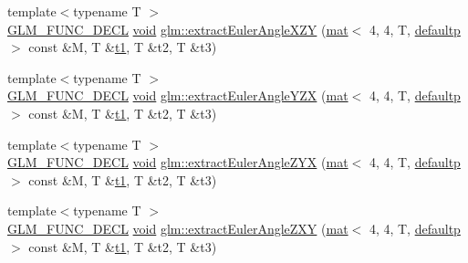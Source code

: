 \begin{DoxyCompactItemize}
\item 
{\footnotesize template$<$typename T $>$ }\\\hyperlink{setup_8hpp_ab2d052de21a70539923e9bcbf6e83a51}{G\+L\+M\+\_\+\+F\+U\+N\+C\+\_\+\+D\+E\+CL} \hyperlink{_s_d_l__opengles2__gl2ext_8h_ae5d8fa23ad07c48bb609509eae494c95}{void} \hyperlink{group__gtx__euler__angles_gabe5a65d8eb1cd873c8de121cce1a15ed}{glm\+::extract\+Euler\+Angle\+X\+ZY} (\hyperlink{structglm_1_1mat}{mat}$<$ 4, 4, T, \hyperlink{namespaceglm_a36ed105b07c7746804d7fdc7cc90ff25a9d21ccd8b5a009ec7eb7677befc3bf51}{defaultp} $>$ const \&M, T \&\hyperlink{_s_d_l__opengl__glext_8h_af48031a37b713afa3b0d0d7d29653d7c}{t1}, T \&t2, T \&t3)
\item 
{\footnotesize template$<$typename T $>$ }\\\hyperlink{setup_8hpp_ab2d052de21a70539923e9bcbf6e83a51}{G\+L\+M\+\_\+\+F\+U\+N\+C\+\_\+\+D\+E\+CL} \hyperlink{_s_d_l__opengles2__gl2ext_8h_ae5d8fa23ad07c48bb609509eae494c95}{void} \hyperlink{group__gtx__euler__angles_ga9049b78466796c0de2971756e25b93d3}{glm\+::extract\+Euler\+Angle\+Y\+ZX} (\hyperlink{structglm_1_1mat}{mat}$<$ 4, 4, T, \hyperlink{namespaceglm_a36ed105b07c7746804d7fdc7cc90ff25a9d21ccd8b5a009ec7eb7677befc3bf51}{defaultp} $>$ const \&M, T \&\hyperlink{_s_d_l__opengl__glext_8h_af48031a37b713afa3b0d0d7d29653d7c}{t1}, T \&t2, T \&t3)
\item 
{\footnotesize template$<$typename T $>$ }\\\hyperlink{setup_8hpp_ab2d052de21a70539923e9bcbf6e83a51}{G\+L\+M\+\_\+\+F\+U\+N\+C\+\_\+\+D\+E\+CL} \hyperlink{_s_d_l__opengles2__gl2ext_8h_ae5d8fa23ad07c48bb609509eae494c95}{void} \hyperlink{group__gtx__euler__angles_ga2d6c11a4abfa60c565483cee2d3f7665}{glm\+::extract\+Euler\+Angle\+Z\+YX} (\hyperlink{structglm_1_1mat}{mat}$<$ 4, 4, T, \hyperlink{namespaceglm_a36ed105b07c7746804d7fdc7cc90ff25a9d21ccd8b5a009ec7eb7677befc3bf51}{defaultp} $>$ const \&M, T \&\hyperlink{_s_d_l__opengl__glext_8h_af48031a37b713afa3b0d0d7d29653d7c}{t1}, T \&t2, T \&t3)
\item 
{\footnotesize template$<$typename T $>$ }\\\hyperlink{setup_8hpp_ab2d052de21a70539923e9bcbf6e83a51}{G\+L\+M\+\_\+\+F\+U\+N\+C\+\_\+\+D\+E\+CL} \hyperlink{_s_d_l__opengles2__gl2ext_8h_ae5d8fa23ad07c48bb609509eae494c95}{void} \hyperlink{group__gtx__euler__angles_ga81fbbca2ba0c778b9662d5355b4e2363}{glm\+::extract\+Euler\+Angle\+Z\+XY} (\hyperlink{structglm_1_1mat}{mat}$<$ 4, 4, T, \hyperlink{namespaceglm_a36ed105b07c7746804d7fdc7cc90ff25a9d21ccd8b5a009ec7eb7677befc3bf51}{defaultp} $>$ const \&M, T \&\hyperlink{_s_d_l__opengl__glext_8h_af48031a37b713afa3b0d0d7d29653d7c}{t1}, T \&t2, T \&t3)
\end{DoxyCompactItemize}


